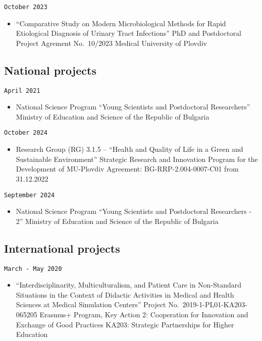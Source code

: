 \documentclass[
  12pt,
  letterpaper,
  DIV=11,
  numbers=noendperiod]{scrartcl}
\providecommand{\tightlist}{%
  \setlength{\itemsep}{0pt}\setlength{\parskip}{0pt}}\usepackage{longtable,booktabs,array}
\begin{document}
\texttt{October\ 2023}

\begin{itemize}
\tightlist
\item
  ``Comparative Study on Modern Microbiological Methods for Rapid
  Etiological Diagnosis of Urinary Tract Infections'' \textbar{} PhD and
  Postdoctoral Project \textbar{} Agrement No.~10/2023 \textbar{}
  Medical University of Plovdiv
\end{itemize}

\subsection{National projects}\label{national-projects}

\texttt{April\ 2021}

\begin{itemize}
\tightlist
\item
  National Science Program ``Young Scientists and Postdoctoral
  Researchers'' \textbar{} Ministry of Education and Science of the
  Republic of Bulgaria
\end{itemize}

\texttt{October\ 2024}

\begin{itemize}
\tightlist
\item
  Research Group (RG) 3.1.5 -- ``Health and Quality of Life in a Green
  and Sustainable Environment'' \textbar{} Strategic Research and
  Innovation Program for the Development of MU-Plovdiv \textbar{}
  Agreement: BG-RRP-2.004-0007-C01 from 31.12.2022
\end{itemize}

\texttt{September\ 2024}

\begin{itemize}
\tightlist
\item
  National Science Program ``Young Scientists and Postdoctoral
  Researchers - 2'' \textbar{} Ministry of Education and Science of the
  Republic of Bulgaria
\end{itemize}

\subsection{International projects}\label{international-projects}

\texttt{March\ -\ May\ 2020}

\begin{itemize}
\tightlist
\item
  ``Interdisciplinarity, Multiculturalism, and Patient Care in
  Non-Standard Situations in the Context of Didactic Activities in
  Medical and Health Sciences at Medical Simulation Centers'' \textbar{}
  Project No.~2019-1-PL01-KA203-065205 \textbar{} Erasmus+ Program, Key
  Action 2: Cooperation for Innovation and Exchange of Good Practices
  \textbar{} KA203: Strategic Partnerships for Higher Education
\end{itemize}
\end{document}
